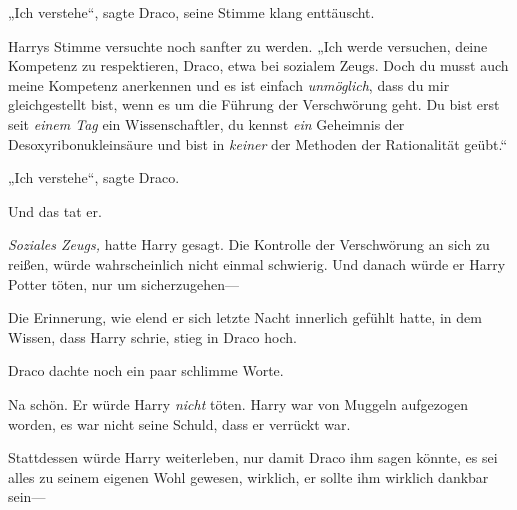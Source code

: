„Ich verstehe“, sagte Draco, seine Stimme klang enttäuscht.

Harrys Stimme versuchte noch sanfter zu werden. „Ich werde versuchen, deine Kompetenz zu respektieren, Draco, etwa bei sozialem Zeugs. Doch du musst auch meine Kompetenz anerkennen und es ist einfach \emph{unmöglich}, dass du mir gleichgestellt bist, wenn es um die Führung der Verschwörung geht. Du bist erst seit \emph{einem Tag} ein Wissenschaftler, du kennst \emph{ein} Geheimnis der Desoxyribonukleinsäure und bist in \emph{keiner} der Methoden der Rationalität geübt.“

„Ich verstehe“, sagte Draco.

Und das tat er.

\emph{Soziales Zeugs,} hatte Harry gesagt. Die Kontrolle der Verschwörung an sich zu reißen, würde wahrscheinlich nicht einmal schwierig. Und danach würde er Harry Potter töten, nur um sicherzugehen—

Die Erinnerung, wie elend er sich letzte Nacht innerlich gefühlt hatte, in dem Wissen, dass Harry schrie, stieg in Draco hoch.

Draco dachte noch ein paar schlimme Worte.

Na schön. Er würde Harry \emph{nicht} töten. Harry war von Muggeln aufgezogen worden, es war nicht seine Schuld, dass er verrückt war.

Stattdessen würde Harry weiterleben, nur damit Draco ihm sagen könnte, es sei alles zu seinem eigenen Wohl gewesen, wirklich, er sollte ihm wirklich dankbar sein—


